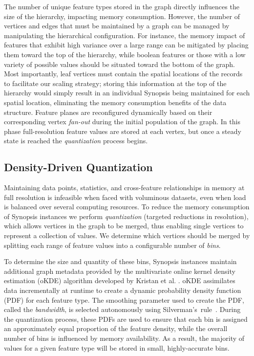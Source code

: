 The number of unique feature types stored in the graph directly influences the size of the hierarchy, impacting memory consumption. However, the number of vertices and edges that must be maintained by a graph can be managed by manipulating the hierarchical configuration. For instance, the memory impact of features that exhibit high variance over a large range can be mitigated by placing them toward the top of the hierarchy, while boolean features or those with a low variety of possible values should be situated toward the bottom of the graph. Most importantly, leaf vertices must contain the spatial locations of the records to facilitate our scaling strategy; storing this information at the top of the hierarchy would simply result in an individual Synopsis being maintained for each spatial location, eliminating the memory consumption benefits of the data structure. Feature planes are reconfigured dynamically based on their corresponding vertex \emph{fan-out} during the initial population of the graph. In this phase full-resolution feature values are stored at each vertex, but once a steady state is reached the \emph{quantization} process begins.

\subsection{Density-Driven Quantization}
Maintaining data points, statistics, and cross-feature relationships in memory at full resolution is infeasible when faced with voluminous datasets, even when load is balanced over several computing resources. To reduce the memory consumption of Synopsis instances we perform \emph{quantization} (targeted reductions in resolution), which allows vertices in the graph to be merged, thus enabling single vertices to represent a collection of values. We determine which vertices should be merged by splitting each range of feature values into a configurable number of \emph{bins}.

To determine the size and quantity of these bins, Synopsis instances maintain additional graph metadata provided by the multivariate online kernel density estimation (oKDE) algorithm developed by Kristan et al. \cite{kristan2011multivariate}. oKDE assimilates data incrementally at runtime to create a dynamic probability density function (PDF) for each feature type. The smoothing parameter used to create the PDF, called the \emph{bandwidth}, is selected autonomously using Silverman's~rule~\cite{silverman1986density}. During the quantization process, these PDFs are used to ensure that each bin is assigned an approximately equal proportion of the feature density, while the overall number of bins is influenced by memory availability. As a result, the majority of values for a given feature type will be stored in small, highly-accurate bins.


